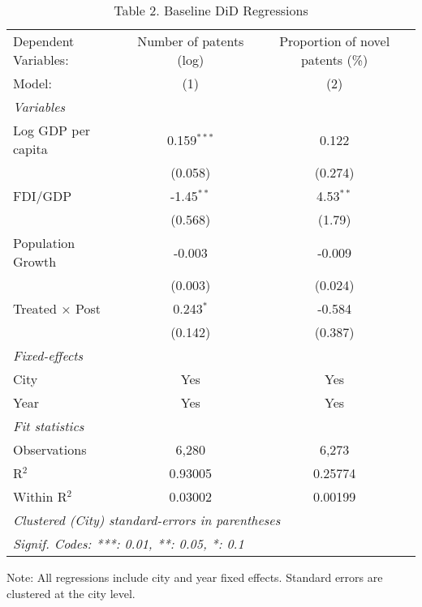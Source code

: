 \documentclass[12pt]{article}
\begin{document}
\begin{table}[htbp]
   \caption*{Table 2. Baseline DiD Regressions}
   \centering
   \begin{tabular}{lcc}
      \tabularnewline \midrule \midrule
      Dependent Variables: & Number of patents (log)  & Proportion of novel patents (\%) \\   
      Model:               & (1)              & (2)\\  
      \midrule
      \emph{Variables}\\
      Log GDP per capita   & 0.159$^{***}$    & 0.122\\   
                           & (0.058)          & (0.274)\\   
      FDI/GDP              & -1.45$^{**}$     & 4.53$^{**}$\\   
                           & (0.568)          & (1.79)\\   
      Population Growth    & -0.003           & -0.009\\   
                           & (0.003)          & (0.024)\\   
      Treated × Post       & 0.243$^{*}$      & -0.584\\   
                           & (0.142)          & (0.387)\\   
      \midrule
      \emph{Fixed-effects}\\
      City                 & Yes              & Yes\\  
      Year                 & Yes              & Yes\\  
      \midrule
      \emph{Fit statistics}\\
      Observations         & 6,280            & 6,273\\  
      R$^2$                & 0.93005          & 0.25774\\  
      Within R$^2$         & 0.03002          & 0.00199\\  
      \midrule \midrule
      \multicolumn{3}{l}{\emph{Clustered (City) standard-errors in parentheses}}\\
      \multicolumn{3}{l}{\emph{Signif. Codes: ***: 0.01, **: 0.05, *: 0.1}}\\
   \end{tabular}
   
   \par \raggedright 
   Note: All regressions include city and year fixed effects. Standard errors are clustered at the city level.
\end{table}
\end{document}
